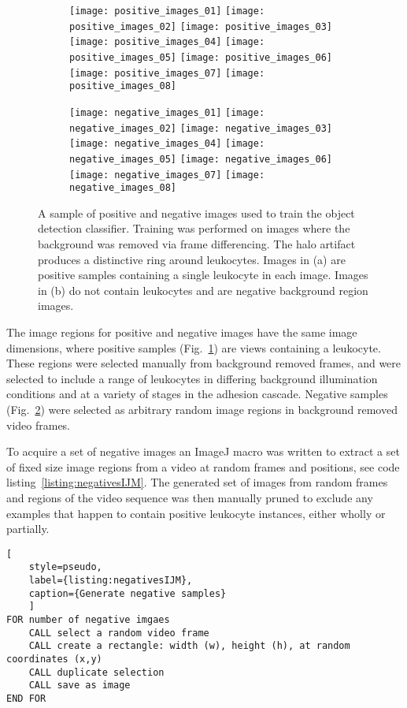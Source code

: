 \begin{figure}[htbp]{}
	\begin{subfigure}[b]{\linewidth}
		\centering
		\texttt{[image: positive\_images\_01]}
		\texttt{[image: positive\_images\_02]}
		\texttt{[image: positive\_images\_03]}
		\texttt{[image: positive\_images\_04]}
		\texttt{[image: positive\_images\_05]}
		\texttt{[image: positive\_images\_06]}
		\texttt{[image: positive\_images\_07]}
		\texttt{[image: positive\_images\_08]}
		\caption{}
		\label{positive_images:a}
	\end{subfigure}
	\begin{subfigure}[b]{\linewidth}
		\centering
		\texttt{[image: negative\_images\_01]}
		\texttt{[image: negative\_images\_02]}
		\texttt{[image: negative\_images\_03]}
		\texttt{[image: negative\_images\_04]}
		\texttt{[image: negative\_images\_05]}
		\texttt{[image: negative\_images\_06]}
		\texttt{[image: negative\_images\_07]}
		\texttt{[image: negative\_images\_08]}
		\caption{}
		\label{negative_images:b}
	\end{subfigure}
\caption[Classifier training samples]{A sample of positive and negative images used to train the object detection classifier. Training was performed on images where the background was removed via frame differencing. The halo artifact produces a distinctive ring around leukocytes. Images in (a) are positive samples containing a single leukocyte in each image. Images in (b) do not contain leukocytes and are negative background region images.}
\label{figure:classifier_samples}
\end{figure}

The image regions for positive and negative images have the same image dimensions, where positive samples (Fig.~\ref{positive_images:a}) are views containing a leukocyte. These regions were selected manually from background removed frames, and were selected to include a range of leukocytes in differing background illumination conditions and at a variety of stages in the adhesion cascade. Negative samples (Fig.~\ref{negative_images:b}) were selected as arbitrary random image regions in background removed video frames.

To acquire a set of negative images an ImageJ macro was written to extract a set of fixed size image regions from a video at random frames and positions, see code listing~\ref{listing:negativesIJM}. The generated set of images from random frames and regions of the video sequence was then manually pruned to exclude any examples that happen to contain positive leukocyte instances, either wholly or partially.
\begin{lstlisting}[
	style=pseudo,
	label={listing:negativesIJM},
	caption={Generate negative samples}
	]
FOR number of negative imgaes
	CALL select a random video frame
	CALL create a rectangle: width (w), height (h), at random coordinates (x,y)
	CALL duplicate selection
	CALL save as image
END FOR
\end{lstlisting}

